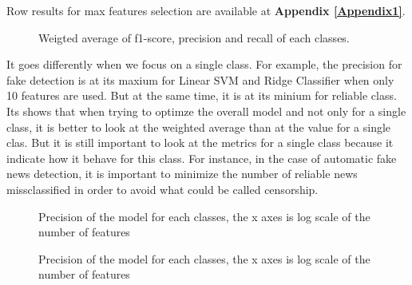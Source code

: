 Row results for max features selection are available at \textbf{Appendix \ref{Appendix1}}.
\begin{figure}[]
	\centering
	\caption{Weigted average of f1-score, precision and recall of each classes. }
	\label{fig:chap3:max_feature3}
\end{figure}
It goes differently when we focus on a single class. For example, the precision for fake detection is at its maxium for Linear SVM and Ridge Classifier when only 10 features are used. But at the same time, it is at its minium for reliable class. Its shows that when trying to optimze the overall model and not only for a single class, it is better to look at the weighted average than at the value for a single clas. But it is still important to look at the metrics for a single class because it indicate how it behave for this class. For instance, in the case of automatic fake news detection, it is important to minimize the number of reliable news missclassified in order to avoid what could be called censorship. 
\begin{figure}[]
	\centering
	\caption{Precision of the model for each classes, the x axes is log scale of the number of features}
	\label{fig:chap3:max_feature1}
\end{figure}

\begin{figure}[]
	\centering
	\caption{Precision of the model for each classes, the x axes is log scale of the number of features}
	\label{fig:chap3:max_feature2}
\end{figure}

